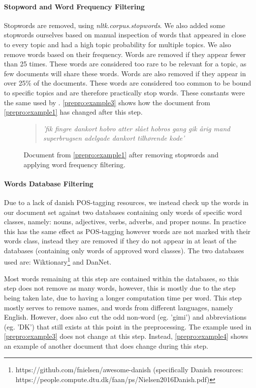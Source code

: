 \paragraph{Stopword and Word Frequency Filtering}
Stopwords are removed, using \emph{nltk.corpus.stopwords}. We also added some stopwords ourselves based on manual inspection of words that appeared in close to every topic and had a high topic probability for multiple topics.
We also remove words based on their frequency. 
Words are removed if they appear fewer than 25 times.
These words are considered too rare to be relevant for a topic, as few documents will share these words.
Words are also removed if they appear in over 25\% of the documents.
These words are considered too common to be bound to specific topics and are therefore practically stop words.
These constants were the same used by \cite{quanti}.
\autoref{prepro:example3} shows how the document from \autoref{prepro:example1} has changed after this step.
\begin{figure}[h]
	\begin{quote}
		\textit{
			'fik fingre dankort hobro atter slået hobros gang gik årig mand superbrugsen adelgade dankort tilhørende kode'
		}
	\end{quote}
	\caption{Document from \autoref{prepro:example1} after removing stopwords and applying word frequency filtering.}
	\label{prepro:example3}
\end{figure}


\paragraph{Words Database Filtering}
Due to a lack of danish POS-tagging resources, we instead check up the words in our document set against two databases containing only words of specific word classes, namely: nouns, adjectives, verbs, adverbs, and proper nouns.
In practice this has the same effect as POS-tagging however words are not marked with their words class, instead they are removed if they do not appear in at least of the databases (containing only words of approved word classes).
The two databases used are:  Wiktionary\footnote{https://github.com/fnielsen/awesome-danish (specifically Danish resources: https://people.compute.dtu.dk/faan/ps/Nielsen2016Danish.pdf)} and DanNet\cite{Pedersen2009DanNetTC}. 

Most words remaining at this step are contained within the databases, so this step does not remove as many words, however, this is mostly due to the step being taken late, due to having a longer computation time per word.
This step mostly serves to remove names, and words from different languages, namely English.
However, does also cut the odd non-word (eg. 'gimi') and abbreviations (eg. 'DK') that still exists at this point in the preprocessing.
The example used in \autoref{prepro:example3} does not change at this step. 
Instead, \autoref{prepro:example4} shows an example of another document that does change during this step.

